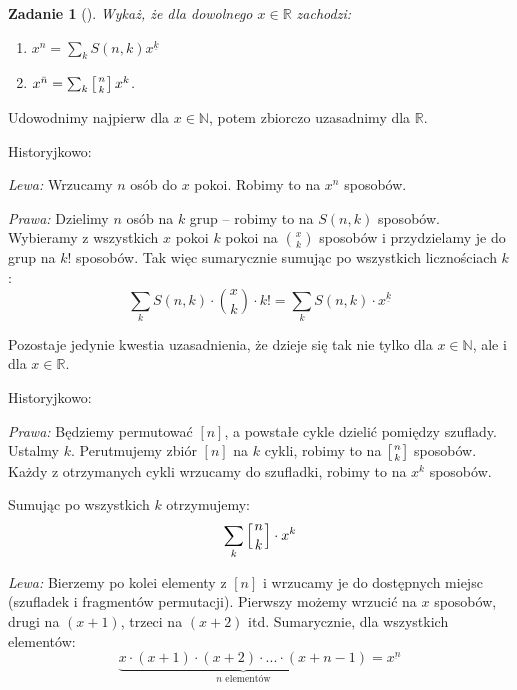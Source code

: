 \documentclass{mwbk}
\newtheorem{zad}{Zadanie}[chapter]
\begin{document}
\begin{zad}[]
    Wykaż, że dla dowolnego $x \in \mathbb{R}$ zachodzi:
    \begin{enumerate}
        \item $x^n = \sum_{k}S(n,k) x^{\underline{k}}$
        \item $x^{\bar{n}} = \sum_{k} \left[n \atop k \right] x^k$.
    \end{enumerate}
\end{zad}
\begin{mdframed}
    \begin{center} Udowodnimy najpierw dla $x \in \mathbb{N}$, potem zbiorczo uzasadnimy dla $\mathbb{R}$.\end{center}
    \begin{enumerate*}
        \item Historyjkowo:

              \textit{Lewa:}
              Wrzucamy $n$ osób do $x$ pokoi. Robimy to na $x^n$ sposobów.

              \textit{Prawa:}
              Dzielimy $n$ osób na $k$ grup -- robimy to na $S(n,k)$ sposobów.
              Wybieramy z wszystkich $x$ pokoi $k$ pokoi na $\binom{x}{k}$
              sposobów i przydzielamy je do grup na $k!$ sposobów.
              Tak więc sumarycznie sumując po wszystkich licznościach $k$:
              \[\sum_{k} S(n, k) \cdot \binom{x}{k} \cdot k! = \sum_{k} S(n, k) \cdot x^{\underline{k}} \]

              Pozostaje jedynie kwestia uzasadnienia, że dzieje się tak
              nie tylko dla $x \in \mathbb{N}$, ale i dla $x \in \mathbb{R}$. \newline


        \item Historyjkowo:

              \textit{Prawa:}
              Będziemy permutować $[n]$, a powstałe cykle dzielić pomiędzy szuflady.
              Ustalmy $k$. Perutmujemy zbiór $[n]$ na $k$ cykli, robimy to na $\left[n \atop k \right]$ sposobów.
              Każdy z otrzymanych cykli wrzucamy do szufladki, robimy to na $x^k$ sposobów.

              Sumując po wszystkich $k$ otrzymujemy:
              \[\sum_k \left[n \atop k \right] \cdot x^k\]

              \textit{Lewa:}
              Bierzemy po kolei elementy z $[n]$ i wrzucamy je do dostępnych miejsc (szufladek i fragmentów permutacji).
              Pierwszy możemy wrzucić na $x$ sposobów, drugi na $(x+1)$, trzeci na $(x+2)$ itd. Sumarycznie, dla wszystkich elementów:
              \[ \underbrace{x \cdot (x+1) \cdot (x+2) \cdot ... \cdot (x + n - 1)}_{\text{$n$ elementów}} = x^{\underbar{n}} \] \newline


\end{enumerate*}
\end{mdframed}
\end{document}
